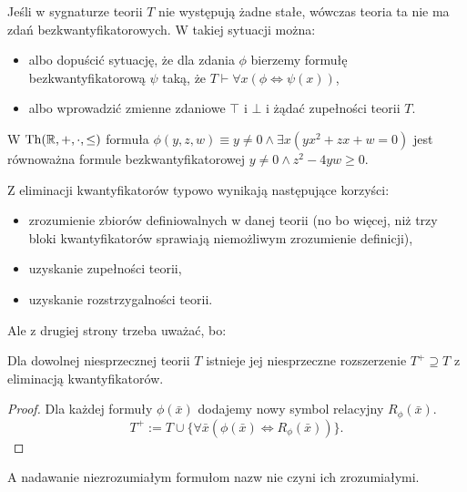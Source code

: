 \documentclass{article}
\begin{document}
\begin{uw}
	Jeśli w sygnaturze teorii $T$ nie występują żadne stałe, wówczas teoria ta nie ma zdań bezkwantyfikatorowych.
	W takiej sytuacji można:
	\begin{itemize}
		\item albo dopuścić sytuację, że dla zdania $\phi$ bierzemy formułę bezkwantyfikatorową $\psi$ taką, że $T \vdash \forall x (\phi \iff \psi(x))$,
		\item albo wprowadzić zmienne zdaniowe $\top$ i $\bot$ i żądać zupełności teorii $T$.
	\end{itemize}
\end{uw}

\begin{prz}
	W $\text{Th}(\mathbb{R}, +, \cdot, \leq)$ formuła $\phi(y, z, w) \equiv y \neq 0 \wedge \exists x (yx^2 + zx + w = 0)$ jest równoważna formule bezkwantyfikatorowej $y \neq 0 \wedge z^2 - 4yw \geq 0$.
\end{prz}

Z eliminacji kwantyfikatorów typowo wynikają następujące korzyści:
\begin{itemize}
	\item zrozumienie zbiorów definiowalnych w danej teorii (no bo więcej, niż trzy bloki kwantyfikatorów sprawiają niemożliwym zrozumienie definicji),
	\item uzyskanie zupełności teorii,
	\item uzyskanie rozstrzygalności teorii.
\end{itemize}

Ale z drugiej strony trzeba uważać, bo:

\begin{stw} Dla dowolnej niesprzecznej teorii $T$ istnieje jej niesprzeczne rozszerzenie $T^+ \supseteq T$ z eliminacją kwantyfikatorów.
\end{stw}
\begin{proof}
	Dla każdej formuły $\phi(\bar{x})$ dodajemy nowy symbol relacyjny $R_{\phi}(\bar{x}).$
	\[T^+ := T \cup \{\forall \bar{x} (\phi(\bar{x}) \iff R_{\phi}(\bar{x}))\}.\]
\end{proof}
A nadawanie niezrozumiałym formułom nazw nie czyni ich zrozumiałymi.
\end{document}
